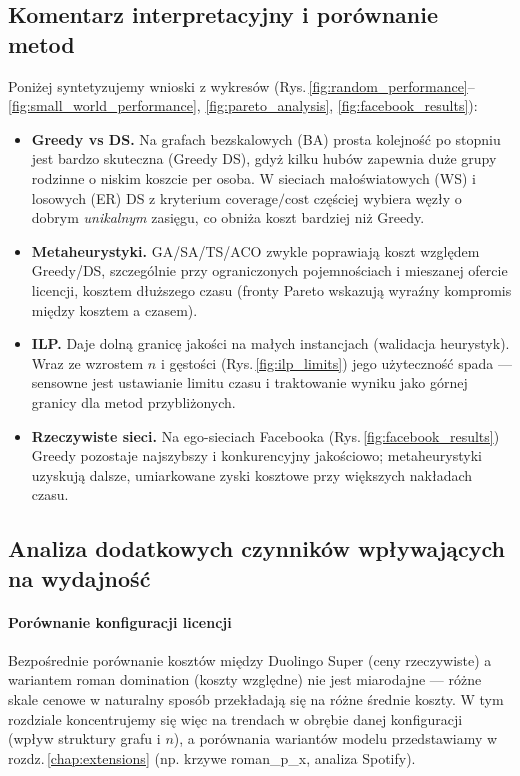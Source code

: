 \subsection{Komentarz interpretacyjny i porównanie metod}
\label{subsec:interpretation}
Poniżej syntetyzujemy wnioski z wykresów (Rys.\,\ref{fig:random_performance}–\ref{fig:small_world_performance}, \ref{fig:pareto_analysis}, \ref{fig:facebook_results}):
\begin{itemize}
  \item \textbf{Greedy vs DS.} Na grafach bezskalowych (BA) prosta kolejność po stopniu jest bardzo skuteczna (Greedy \approx DS), gdyż kilku hubów zapewnia duże grupy rodzinne o niskim koszcie per osoba. W sieciach małoświatowych (WS) i losowych (ER) DS z kryterium \(\mathrm{coverage}/\mathrm{cost}\) częściej wybiera węzły o dobrym \emph{unikalnym} zasięgu, co obniża koszt bardziej niż Greedy.
  \item \textbf{Metaheurystyki.} GA/SA/TS/ACO zwykle poprawiają koszt względem Greedy/DS, szczególnie przy ograniczonych pojemnościach i mieszanej ofercie licencji, kosztem dłuższego czasu (fronty Pareto wskazują wyraźny kompromis między kosztem a czasem).
  \item \textbf{ILP.} Daje dolną granicę jakości na małych instancjach (walidacja heurystyk). Wraz ze wzrostem \(n\) i gęstości (Rys.\,\ref{fig:ilp_limits}) jego użyteczność spada — sensowne jest ustawianie limitu czasu i traktowanie wyniku jako górnej granicy dla metod przybliżonych.
  \item \textbf{Rzeczywiste sieci.} Na ego-sieciach Facebooka (Rys.\,\ref{fig:facebook_results}) Greedy pozostaje najszybszy i konkurencyjny jakościowo; metaheurystyki uzyskują dalsze, umiarkowane zyski kosztowe przy większych nakładach czasu.
\end{itemize}

\subsection{Analiza dodatkowych czynników wpływających na wydajność}

\paragraph{Porównanie konfiguracji licencji}
Bezpośrednie porównanie kosztów między Duolingo Super (ceny rzeczywiste) a wariantem roman domination (koszty względne) nie jest miarodajne — różne skale cenowe w naturalny sposób przekładają się na różne średnie koszty. W tym rozdziale koncentrujemy się więc na trendach w obrębie danej konfiguracji (wpływ struktury grafu i \(n\)), a porównania wariantów modelu przedstawiamy w rozdz.\,\ref{chap:extensions} (np. krzywe roman\_p\_x, analiza Spotify).

